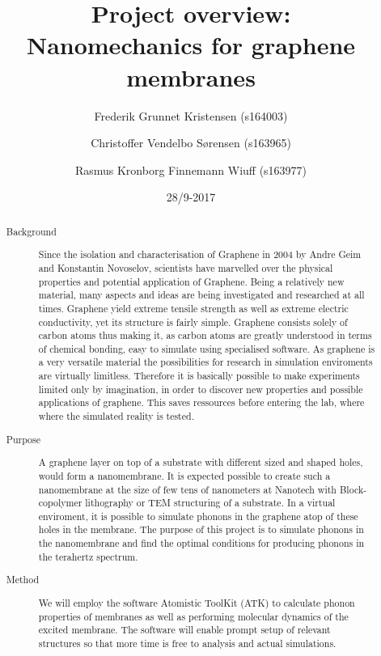




\title{Project overview:\\Nanomechanics for graphene membranes}
\date{28/9-2017}
\author{Frederik Grunnet Kristensen (s164003)}
\author{Christoffer Vendelbo Sørensen (s163965)}
\author{Rasmus Kronborg Finnemann Wiuff (s163977)}

\begin{abstract}
  \begin{description}
    \item[Background] Since the isolation and characterisation of Graphene in 2004 by Andre Geim and Konstantin Novoselov, scientists have marvelled over the physical properties and potential application of Graphene. Being a relatively new material, many aspects and ideas are being investigated and researched at all times. Graphene yield extreme tensile strength as well as extreme electric conductivity, yet its structure is fairly simple.
    Graphene consists solely of carbon atoms thus making it, as carbon atoms are greatly understood in terms of chemical bonding, easy to simulate using specialised software.
    As graphene is a very versatile material the possibilities for research in simulation enviroments are virtually limitless. Therefore it is basically possible to make experiments limited only by imagination, in order to discover new properties and possible applications of graphene. This saves ressources before entering the lab, where where the simulated reality is tested.
    \item[Purpose] A graphene layer on top of a substrate with different sized and shaped holes, would form a nanomembrane. It is expected possible to create such a nanomembrane at the size of few tens of nanometers at Nanotech with Block-copolymer lithography or TEM structuring of a substrate.
    In a virtual enviroment, it is possible to simulate phonons in the graphene atop of these holes in the membrane. The purpose of this project is to simulate phonons in the nanomembrane and find the optimal conditions for producing phonons in the terahertz spectrum.
    \item[Method] We will employ the software Atomistic ToolKit (ATK) to calculate phonon properties of membranes as well as performing molecular dynamics of the excited membrane. The software will enable prompt setup of relevant structures so that more time is free to analysis and actual simulations.
  \end{description}
\end{abstract}


\maketitle


\thispagestyle{empty}
\setcounter{page}{1}




